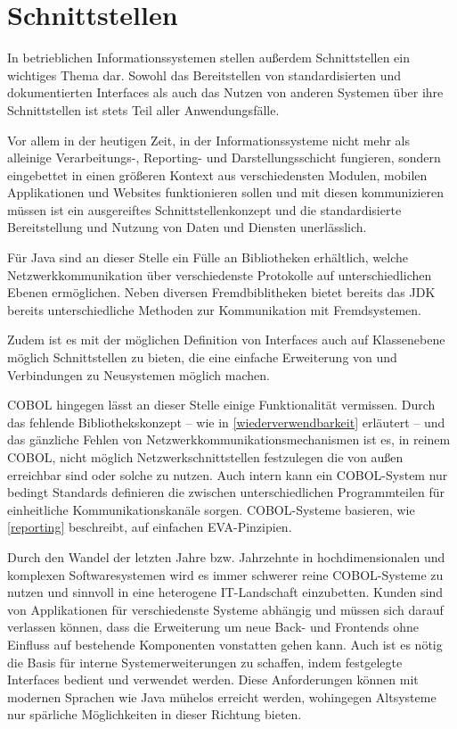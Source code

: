 \section{Schnittstellen}
In betrieblichen Informationssystemen stellen außerdem Schnittstellen ein wichtiges Thema dar. Sowohl das Bereitstellen von standardisierten und dokumentierten Interfaces als auch das Nutzen von anderen Systemen über ihre Schnittstellen ist stets Teil aller Anwendungsfälle. 

Vor allem in der heutigen Zeit, in der Informationssysteme nicht mehr als alleinige Verarbeitungs-, Reporting- und Darstellungsschicht fungieren, sondern eingebettet in einen größeren Kontext aus verschiedensten Modulen, mobilen Applikationen und Websites funktionieren sollen und mit diesen kommunizieren müssen ist ein ausgereiftes Schnittstellenkonzept und die standardisierte Bereitstellung und Nutzung von Daten und Diensten unerlässlich.

Für Java sind an dieser Stelle ein Fülle an Bibliotheken erhältlich, welche Netzwerkkommunikation über verschiedenste Protokolle auf unterschiedlichen Ebenen ermöglichen. Neben diversen Fremdbiblitheken bietet bereits das JDK bereits unterschiedliche Methoden zur Kommunikation mit Fremdsystemen.

Zudem ist es mit der möglichen Definition von Interfaces auch auf Klassenebene möglich Schnittstellen zu bieten, die eine einfache Erweiterung von und Verbindungen zu Neusystemen möglich machen.

COBOL hingegen lässt an dieser Stelle einige Funktionalität vermissen. Durch das fehlende Bibliothekskonzept -- wie in \autoref{wiederverwendbarkeit} erläutert -- und das gänzliche Fehlen von Netzwerkkommunikationsmechanismen ist es, in reinem COBOL, nicht möglich Netzwerkschnittstellen festzulegen die von außen erreichbar sind oder solche zu nutzen. Auch intern kann ein COBOL-System nur bedingt Standards definieren die zwischen unterschiedlichen Programmteilen für einheitliche Kommunikationskanäle sorgen. COBOL-Systeme basieren, wie \autoref{reporting} beschreibt, auf einfachen EVA-Pinzipien.

Durch den Wandel der letzten Jahre bzw. Jahrzehnte in hochdimensionalen und komplexen Softwaresystemen wird es immer schwerer reine COBOL-Systeme zu nutzen und sinnvoll in eine heterogene IT-Landschaft einzubetten. Kunden sind von Applikationen für verschiedenste Systeme abhängig und müssen sich darauf verlassen können, dass die Erweiterung um neue Back- und Frontends ohne Einfluss auf bestehende Komponenten vonstatten gehen kann. Auch ist es nötig die Basis für interne Systemerweiterungen zu schaffen, indem festgelegte Interfaces bedient und verwendet werden. Diese Anforderungen können mit modernen Sprachen wie Java mühelos erreicht werden, wohingegen Altsysteme nur spärliche Möglichkeiten in dieser Richtung bieten.